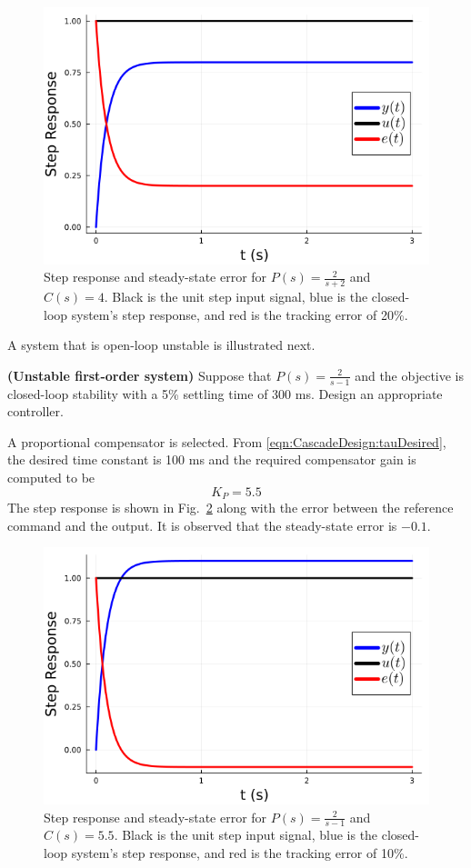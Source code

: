 \begin{figure}[bt]
      \centering
      \includegraphics[width = .4\linewidth]{graphics/Chap10/C5P5StepResponse.png}
    \caption[]{Step response and steady-state error for $P(s)=\frac{2}{s+2}$ and $C(s)=4$. Black is the unit step input signal, blue is the closed-loop system's step response, and red is the tracking error of 20\%. }
    \label{fig:CascadeDesign:StepStableFirstOrder}
  \end{figure}

\bigskip

A system that is open-loop unstable is illustrated next.

\begin{example} {\bf (Unstable first-order system)}
\label{example:CascadeDesign:UnstableFirstOrder}
Suppose that $P(s)=\frac{2}{s-1}$ and the objective is closed-loop stability with a 5\% settling time of 300 ms. Design an appropriate controller.
\end{example}

\solution A proportional compensator is selected. From  \eqref{eqn:CascadeDesign:tauDesired}, the desired time constant is 100 ms and the required compensator gain is computed to be
$$K_P=5.5 $$
The step response is shown in Fig.~\ref{fig:CascadeDesign:StepUnstableFirstOrder} along with the error between the reference command and the output. It is observed that the steady-state error is $-0.1$.

\bigskip\noindent
{}

\begin{figure}[bt]
      \centering
      \includegraphics[width = .4\linewidth]{graphics/Chap10/C4P4StepResponse.png}
    \caption[]{Step response and steady-state error for $P(s)=\frac{2}{s-1}$ and $C(s)=5.5$. Black is the unit step input signal, blue is the closed-loop system's step response, and red is the tracking error of 10\%. }
    \label{fig:CascadeDesign:StepUnstableFirstOrder}
  \end{figure}

